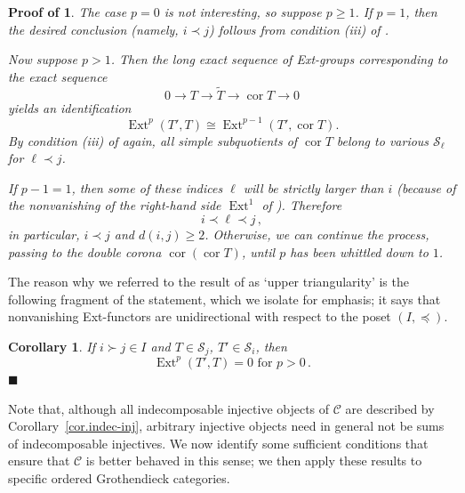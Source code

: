 \documentclass[11pt]{article}
\theoremstyle{plain}
\newtheorem{corollary}[lemma]{Corollary}
\theoremstyle{nonumberplain}
\theoremstyle{plain}
\theoremstyle{nonumberplain}
\newtheorem{proof-of-uptri}{Proof of \Cref{pr.up-tri}}
\newcommand\cC{\mathcal C}
\newcommand\cS{\mathcal S}
\DeclareMathOperator{\ext}{\mathrm{Ext}}
\DeclareMathOperator{\cor}{\mathrm{cor}}
\newcommand{\qedhere}{\mbox{}\hfill\ensuremath{\blacksquare}}
\begin{document}
\begin{proof-of-uptri}
The case $p=0$ is not interesting, so suppose $p\ge 1$. If $p=1$, then
the desired conclusion (namely, $i\prec j$) follows from condition (iii) of
. 

Now suppose $p>1$. Then the long exact sequence of Ext-groups corresponding to the exact sequence
$$0 \to T\to \tilde{T}\to \cor T \to 0$$
yields an identification
\begin{equation}\label{eq:p_1}
  \ext^p(T',T)\cong \ext^{p-1}(T',\cor T). 
\end{equation}
By condition (iii) of  again, all simple
subquotients of
$\cor T$ belong to various $\cS_{\ell}$ for ${\ell \prec} j$.

If $p-1=1$, then some of these indices ${\ell}$ will be strictly
larger than $i$ (because of the nonvanishing of the right-hand side
$\ext^1$ of ).  Therefore
\begin{equation*}
  i {\prec \ell \prec} j\,,
\end{equation*}
in particular, $i\prec j$ and $d(i,j)\geq 2$.
Otherwise, we can continue the process, passing to the double corona
$\cor(\cor T )$, until $p$ has been whittled down to $1$.
\end{proof-of-uptri}




The reason why we referred to the result of  as `upper
triangularity' is the following fragment of the statement, which we
isolate for emphasis; it says that nonvanishing Ext-functors are
unidirectional with respect to the poset $(I,{\preceq})$.


\begin{corollary}\label{cor.up-tri}
  If $i{\succ}j\in I$ and $T\in \cS_j$, $T'\in \cS_i$, then
\begin{equation*}
  \ext^p(T',T)=0\text{ for } p>0\,.
\end{equation*} \qedhere
\end{corollary}







Note that, although all indecomposable injective objects of $\mathcal{C}$ are described by Corollary~\ref{cor.indec-inj}, arbitrary injective objects need in general not be sums of
indecomposable injectives. We now identify some
sufficient conditions that ensure that $\cC$ is better behaved in this
sense; we then apply these results to specific ordered Grothendieck categories.
\end{document}
